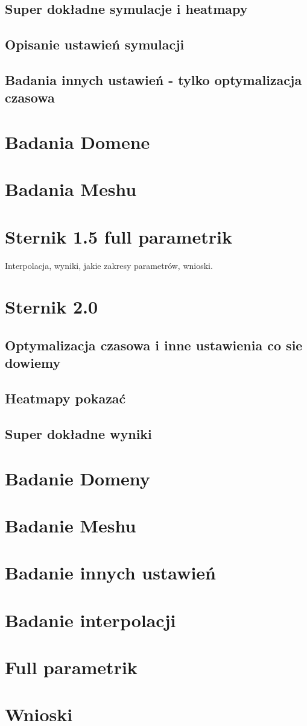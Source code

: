\documentclass{article}
\begin{document}
\subsection{Super dokładne symulacje i heatmapy}
\subsection{Opisanie ustawień symulacji}
\subsection{Badania innych ustawień - tylko optymalizacja czasowa}

\section{Badania Domene}

\section{Badania Meshu}

\section{Sternik 1.5 full parametrik}
Interpolacja, wyniki, jakie zakresy parametrów, wnioski.

\section{Sternik 2.0}
\subsection{Optymalizacja czasowa i inne ustawienia co sie dowiemy}
\subsection{Heatmapy pokazać}
\subsection{Super dokładne wyniki}

\section{Badanie Domeny}

\section{Badanie Meshu}

\section{Badanie innych ustawień}

\section{Badanie interpolacji}

\section{Full parametrik}

\section{Wnioski}
\end{document}
